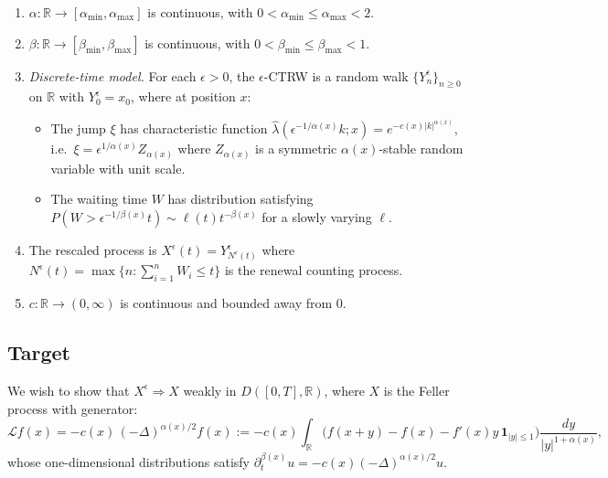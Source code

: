 \documentclass{amsart}
\theoremstyle{definition}
\begin{document}
\begin{enumerate}
    \item[(A1)] $\alpha \colon \mathbb{R} \to [\alpha_{\min}, \alpha_{\max}]$ is
                continuous, with $0 < \alpha_{\min} \leq \alpha_{\max} < 2$.
    \item[(A2)] $\beta \colon \mathbb{R} \to [\beta_{\min}, \beta_{\max}]$ is
                continuous, with $0 < \beta_{\min} \leq \beta_{\max} < 1$.
    \item[(A3)] \emph{Discrete-time model.} For each $\epsilon > 0$, the
                $\epsilon$-CTRW is a random walk $\{Y^\epsilon_n\}_{n \geq 0}$
                on $\mathbb{R}$ with $Y^\epsilon_0 = x_0$, where at position $x$:
                \begin{itemize}
                    \item The jump $\xi$ has characteristic function
                          $\hat\lambda(\epsilon^{-1/\alpha(x)} k; x) = e^{-c(x)|k|^{\alpha(x)}}$,
                          i.e.\ $\xi = \epsilon^{1/\alpha(x)} Z_{\alpha(x)}$ where
                          $Z_{\alpha(x)}$ is a symmetric $\alpha(x)$-stable random variable
                          with unit scale.
                    \item The waiting time $W$ has distribution satisfying
                          $P(W > \epsilon^{-1/\beta(x)} t) \sim \ell(t) t^{-\beta(x)}$
                          for a slowly varying $\ell$.
                \end{itemize}
    \item[(A4)] The rescaled process is
                $X^\epsilon(t) = Y^\epsilon_{N^\epsilon(t)}$
                where $N^\epsilon(t) = \max\{n : \sum_{i=1}^n W_i \leq t\}$
                is the renewal counting process.
    \item[(A5)] $c \colon \mathbb{R} \to (0,\infty)$ is continuous and bounded
                away from 0.
\end{enumerate}

\subsection{Target}
We wish to show that $X^\epsilon \Rightarrow X$ weakly in $D([0,T], \mathbb{R})$,
where $X$ is the Feller process with generator:
\begin{equation}
    \label{eq:generator}
    \mathcal{L} f(x)
    = -c(x)\,(-\Delta)^{\alpha(x)/2} f(x)
    := -c(x) \int_{\mathbb{R}} \bigl(f(x+y) - f(x) - f'(x)y\,\mathbf{1}_{|y|\leq 1}\bigr)
       \frac{dy}{|y|^{1+\alpha(x)}},
\end{equation}
whose one-dimensional distributions satisfy
$\partial_t^{\beta(x)} u = -c(x)(-\Delta)^{\alpha(x)/2} u$.
\end{document}
